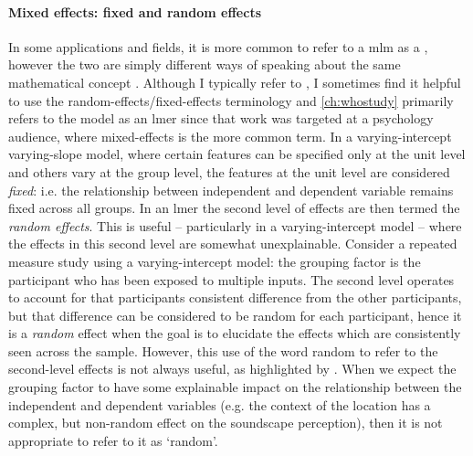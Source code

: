 \paragraph*{Mixed effects: fixed and random effects} In some applications and fields, it is more common to refer to a \gls{mlm} as a , however the two are simply different ways of speaking about the same mathematical concept \citep{Pinheiro2000Linear,DataAnalysisUsingGelman}. Although I typically refer to , I sometimes find it helpful to use the random-effects/fixed-effects terminology and \cref{ch:whostudy} primarily refers to the model as an \gls{lmer} since that work was targeted at a psychology audience, where mixed-effects is the more common term. In a varying-intercept varying-slope model, where certain features can be specified only at the unit level and others vary at the group level, the features at the unit level are considered \emph{fixed}: i.e. the relationship between independent and dependent variable remains fixed across all groups. In an \gls{lmer} the second level of effects are then termed the \emph{random effects}. This is useful -- particularly in a varying-intercept model -- where the effects in this second level are somewhat unexplainable. Consider a repeated measure study using a varying-intercept model: the grouping factor is the participant who has been exposed to multiple inputs. The second level operates to account for that participants consistent difference from the other participants, but that difference can be considered to be random for each participant, hence it is a \emph{random} effect when the goal is to elucidate the effects which are consistently seen across the sample. However, this use of the word random to refer to the second-level effects is not always useful, as highlighted by \citet[pg. 2]{DataAnalysisUsingGelman}. When we expect the grouping factor to have some explainable impact on the relationship between the independent and dependent variables (e.g. the context of the location has a complex, but non-random effect on the soundscape perception), then it is not appropriate to refer to it as `random'. 


